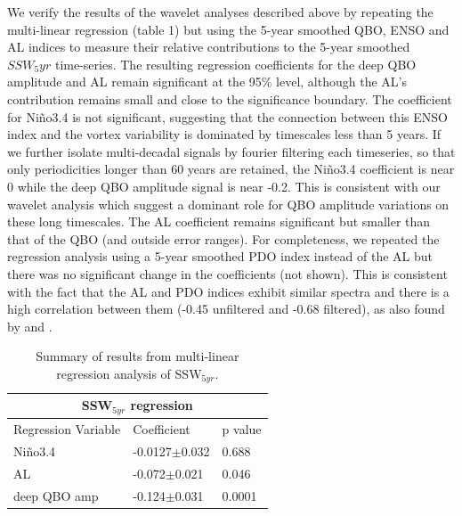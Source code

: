We verify the results of the wavelet analyses described above by repeating the multi-linear regression (table 1) but using the 5-year smoothed QBO, ENSO and AL indices to measure their  relative contributions to the 5-year smoothed  $SSW_5yr$ time-series. The resulting regression coefficients for the deep QBO amplitude and AL remain significant at the 95\% level, although the AL's contribution remains small and close to the significance boundary. The coefficient for Ni\~{n}o3.4 is not significant, suggesting that the connection between this ENSO index and the vortex variability is dominated by timescales less than 5 years. If we further isolate multi-decadal signals by fourier filtering each timeseries, so that only periodicities longer than 60 years are retained, the Ni\~{n}o3.4 coefficient is near 0 while the deep QBO amplitude signal is near -0.2. This is consistent with our wavelet analysis which suggest a dominant role for QBO amplitude variations on these long timescales. The AL coefficient remains significant but smaller than that of the QBO (and outside error ranges). For completeness, we repeated the regression analysis using a 5-year smoothed PDO index instead of the AL but there was no significant change in the coefficients (not shown). This is consistent with the fact that the AL and PDO indices exhibit similar spectra and there is a high correlation between them (-0.45 unfiltered and -0.68 filtered), as also found by \cite{mantuaPacific1997a} and \cite{rodionovSpatial2005b}. 

\begin{table}
\centering
\begin{tabular}{|p{3cm}||p{3cm}|p{3cm}|}
 \hline
 \multicolumn{3}{|c|}{SSW$_{5yr}$ regression}\\
 \hline
 Regression Variable& Coefficient& p value\\
 \hline
 Ni\~{n}o3.4  & -0.0127$\pm$0.032& 0.688\\
 AL  &   -0.072$\pm$0.021  & 0.046\\
 deep QBO amp &-0.124$\pm$0.031&0.0001\\
 \hline
\end{tabular}
\begin{center}
\caption{Summary of results from multi-linear regression analysis of SSW$_{5yr}$.} 
\end{center}
\end{table}

